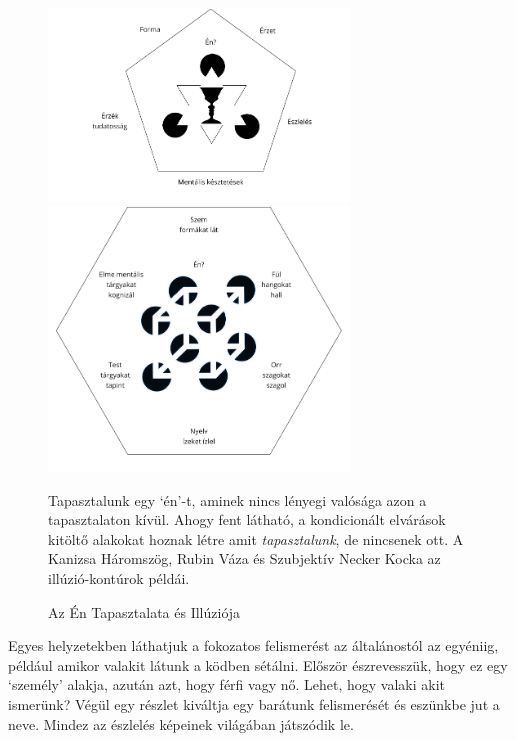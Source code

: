 \begin{figure}[h]
\caption{Az Én Tapasztalata és Illúziója}\label{fig-illusion-of-self}

\centering

\includegraphics[width=80mm]{./manuscript/tex/diagrams/khandhas-self-illusion-hu.pdf}

\bigskip

\includegraphics[width=80mm]{./manuscript/tex/diagrams/senses-self-illusion-hu.pdf}

\bigskip

\begin{minipage}{0.85\linewidth}
\centering\footnotesize
Tapasztalunk egy `én'-t, aminek nincs lényegi valósága azon a tapasztalaton kívül.
Ahogy fent látható, a kondicionált elvárások kitöltő alakokat hoznak létre
amit \emph{tapasztalunk}, de nincsenek ott.
A Kanizsa Háromszög, Rubin Váza és Szubjektív Necker Kocka az illúzió-kontúrok példái.
\end{minipage}

\end{figure}

\vfill\null
\clearpage
\normalpagelayout

Egyes helyzetekben láthatjuk a fokozatos felismerést az általánostól az
egyéniig, például amikor valakit látunk a ködben sétálni. Először
észrevesszük, hogy ez egy `személy' alakja, azután azt, hogy férfi vagy
nő. Lehet, hogy valaki akit ismerünk? Végül egy részlet kiváltja egy
barátunk felismerését és eszünkbe jut a neve. Mindez az észlelés
képeinek világában játszódik le.

